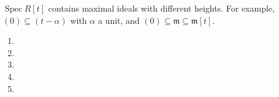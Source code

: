 \begin{exercise}\label{ex3.21}
	$\operatorname{Spec}R[t]$ contains maximal ideals with different heights. For example, $(0)\subseteq(t-\alpha)$ with $\alpha$ a unit, and $(0)\subseteq\mathfrak{m}\subseteq\mathfrak{m}[t]$.
\end{exercise}

\begin{exercise}\label{ex3.22}
	\begin{enumerate}[label=(\alph*),ref=\theexercise(\alph*)]
		\item 
		\item 
		\item 
		\item 
		\item 
	\end{enumerate}
\end{exercise}

\begin{exercise}\label{ex3.23}
	
\end{exercise}
